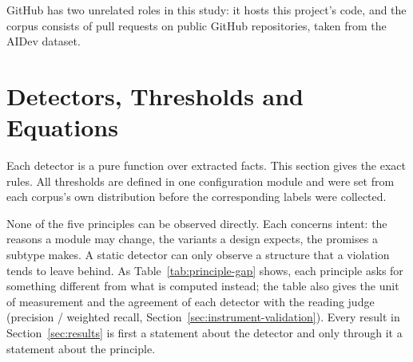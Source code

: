 GitHub has two unrelated roles in this study: it hosts this project's code, and the corpus consists
of pull requests on public GitHub repositories, taken from the AIDev dataset.

\section{Detectors, Thresholds and Equations}
\label{sec:proxies-detail}

Each detector is a pure function over extracted facts. This section gives the exact rules. All
thresholds are defined in one configuration module and were set from each corpus's own distribution
before the corresponding labels were collected.

None of the five principles can be observed directly. Each concerns intent: the reasons a module may
change, the variants a design expects, the promises a subtype makes. A static detector can only
observe a structure that a violation tends to leave behind. As Table~\ref{tab:principle-gap} shows,
each principle asks for something different from what is computed instead; the table also gives the
unit of measurement and the agreement of each detector with the reading judge (precision / weighted
recall, Section~\ref{sec:instrument-validation}). Every result in
Section~\ref{sec:results} is first a statement about the detector and only through it a statement
about the principle.

